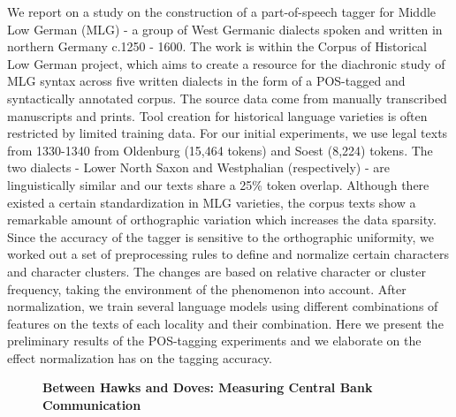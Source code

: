 \documentclass[10pt, a4paper, twopage, headinclude, footinclude, BCOR5mm]{scrartcl}
\begin{document}
\noindent
We report on a study on the construction of a part-of-speech tagger for Middle Low German (MLG) - a group of West Germanic dialects spoken and written in northern Germany c.1250 - 1600. The work is within the Corpus of Historical Low German project, which aims to create a resource for the diachronic study of MLG syntax across five written dialects in the form of a POS-tagged and syntactically annotated corpus. The source data come from manually transcribed manuscripts and prints.  Tool creation for historical language varieties is often restricted by limited training data. For our initial experiments, we use legal texts from 1330-1340 from Oldenburg (15,464 tokens) and Soest (8,224) tokens. The two dialects - Lower North Saxon and Westphalian (respectively) - are linguistically similar and our texts share a 25\% token overlap.  Although there existed a certain standardization in MLG varieties, the corpus texts show a remarkable amount of orthographic variation which increases the data sparsity. Since the accuracy of the tagger is sensitive to the orthographic uniformity, we worked out a set of preprocessing rules to define and normalize certain characters and character clusters. The changes are based on relative character or cluster frequency, taking the environment of the phenomenon into account.  After normalization, we train several language models using different combinations of features on the texts of each locality and their combination. Here we present the preliminary results of the POS-tagging experiments and we elaborate on the effect normalization has on the tagging accuracy.


\newpage

\begin{figure}[t!]
\centering
\large\textbf{Between Hawks and Doves: Measuring Central Bank Communication}
\vspace*{0.5cm}
\end{figure}


        \begin{table}[t!]
    \end{table}
        \begin{table}[t!]
    \end{table}
\end{document}
